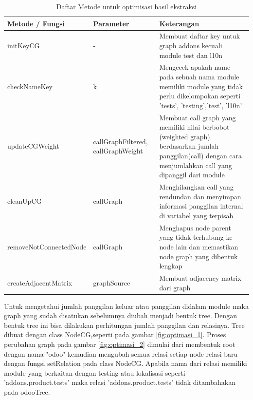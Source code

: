 \begingroup
\setlength{\LTleft}{-20cm plus -1fill}
\setlength{\LTright}{\LTleft}
\begin{small}
	\begin{longtable}{|p{4cm}|p{3cm}|p{6cm}|}
		\caption{Daftar Metode untuk optimisasi hasil ekstraksi}\\
		\hline
		\textbf{Metode / Fungsi} & \textbf{Parameter} & \textbf{Keterangan}\\
		\endfirsthead
		
		 \hline
		 initKeyCG
			& -
		 & Membuat daftar key untuk graph addons kecuali module test dan l10n  \\
		 
		 \hline
		 checkNameKey		 
			& k
		 & Mengecek apakah name pada sebuah nama module memiliki module yang tidak perlu dikelompokan seperti 'tests', 'testing','test', 'l10n' \\

		 \hline
		 updateCGWeight
		& callGraphFiltered, callGraphWeight
		 & Membuat call graph yang memiliki nilai berbobot (weighted graph) berdasarkan jumlah panggilan(call) dengan cara menjumlahkan call yang dipanggil dari module \\

		 
		 \hline 
		 cleanUpCG
			& callGraph
		 & Menghilangkan call yang rendundan dan  menyimpan informasi panggilan internal di variabel yang terpisah\\

		 \hline
		 removeNotConnectedNode
		& callGraph
		 & Menghapus node parent yang tidak terhubung ke node lain  dan memastikan node graph yang dibentuk lengkap\\
		

		 \hline  
		createAdjacentMatrix
		& graphSource
		 & Membuat adjacency matrix dari graph  \\
		
		 \hline  
		 
	\end{longtable}
\end{small}
\endgroup

Untuk mengetahui jumlah panggilan keluar atau panggilan didalam module maka graph yang sudah disatukan sebelumnya diubah menjadi bentuk tree. Dengan bentuk tree ini bisa dilakukan perhitungan jumlah panggilan dan relasinya. Tree dibuat dengan class NodeCG,seperti pada gambar \ref{fig:optimasi_1}. Proses perubahan graph pada gambar \ref{fig:optimasi_2} dimulai dari membentuk root dengan nama "odoo" kemudian mengubah semua relasi setiap node relasi baru dengan fungsi setRelation pada class NodeCG. Apabila nama dari relasi memiliki module yang berkaitan dengan testing atau lokalisasi seperti 'addons.product.tests' maka relasi 'addons.product.tests' tidak ditambahakan pada odooTree. 

